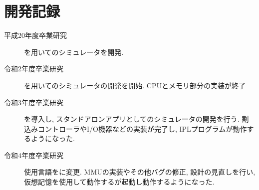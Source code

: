 \section{開発記録}

\begin{description}
    \item[平成20年度卒業研究] \js を用いて\tec のシミュレータを開発.
    \item[令和2年度卒業研究] \js を用いて\tac のシミュレータの開発を開始. CPUとメモリ部分の実装が終了
    \item[令和3年度卒業研究] \electron を導入し, スタンドアロンアプリとして\tac のシミュレータの開発を行う. 割込みコントローラやI/O機器などの実装が完了し, IPLプログラムが動作するようになった.
    \item[令和4年度卒業研究] 使用言語を\ts に変更. MMUの実装やその他バグの修正, 設計の見直しを行い, 仮想記憶を使用して動作する\tacos が起動し動作するようになった.
\end{description}